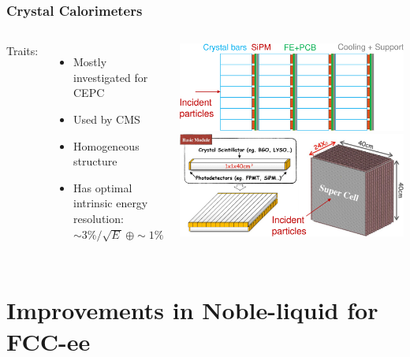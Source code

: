 \documentclass[aspectratio=169]{beamer}
\newcommand{\bluetext}[1]{%
  \textcolor{myBlue}{#1}
}
\begin{document}
\begin{frame}
  \frametitle{Crystal Calorimeters}

  \begin{columns}[c]
    \bluetext{Traits:}
    \begin{itemize}
      \item Mostly investigated for CEPC
      \item Used by CMS
      \item Homogeneous structure
      \item Has optimal intrinsic energy resolution:
            $\sim 3\%/\sqrt{E\,} \, \oplus \sim 1\%$
    \end{itemize}

    \begin{center}
      \includegraphics[width=\linewidth]{figures/CEPC_crystal_calo_design1.png}%
      \vspace{2ex}
      \includegraphics[width=\linewidth]{figures/CEPC_crystal_calo_design2.png}
    \end{center}
  \end{columns}
\end{frame}


%
%
\section{Improvements in Noble-liquid for FCC-ee}
\end{document}
